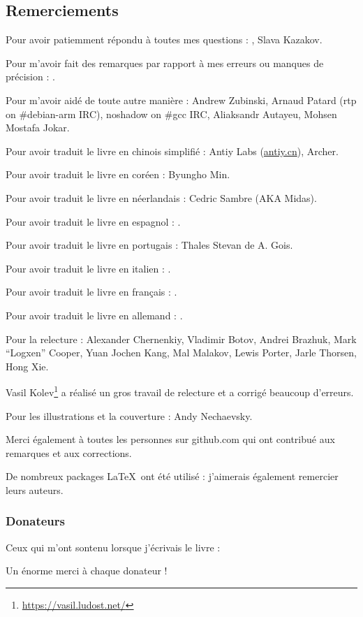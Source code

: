 \subsection*{Remerciements}

Pour avoir patiemment répondu à toutes mes questions : \HERMIT, Slava  Kazakov.

Pour m'avoir fait des remarques par rapport à mes erreurs ou manques de précision : \PeopleMistakesInaccuracies{}.

Pour m'avoir aidé de toute autre manière :
Andrew Zubinski,
Arnaud Patard (rtp on \#debian-arm IRC),
noshadow on \#gcc IRC,
Aliaksandr Autayeu,
Mohsen Mostafa Jokar.

Pour avoir traduit le livre en chinois simplifié :
Antiy Labs (\href{http://antiy.cn}{antiy.cn}), Archer.

Pour avoir traduit le livre en coréen : Byungho Min.

Pour avoir traduit le livre en néerlandais : Cedric Sambre (AKA Midas).

Pour avoir traduit le livre en espagnol : \PeopleSpanishTranslators{}.

Pour avoir traduit le livre en portugais : Thales Stevan de A. Gois.

Pour avoir traduit le livre en italien : \PeopleItalianTranslators{}.

Pour avoir traduit le livre en français : \PeopleFrenchTranslators{}.

Pour avoir traduit le livre en allemand : \PeopleGermanTranslators{}.

Pour la relecture :
Alexander  Chernenkiy,
Vladimir Botov,
Andrei Brazhuk,
Mark ``Logxen'' Cooper, Yuan Jochen Kang, Mal Malakov, Lewis Porter, Jarle Thorsen, Hong Xie.

Vasil Kolev\footnote{\url{https://vasil.ludost.net/}} a réalisé un gros travail de relecture et a corrigé beaucoup d'erreurs.

Pour les illustrations et la couverture : Andy Nechaevsky.

Merci également à toutes les personnes sur github.com qui ont contribué aux remarques et aux corrections\FNGithubContributors{}.

De nombreux packages \LaTeX\ ont été utilisé : j'aimerais également remercier leurs auteurs.

\subsubsection*{Donateurs}

Ceux qui m'ont sontenu lorsque j'écrivais le livre :



Un énorme merci à chaque donateur !
